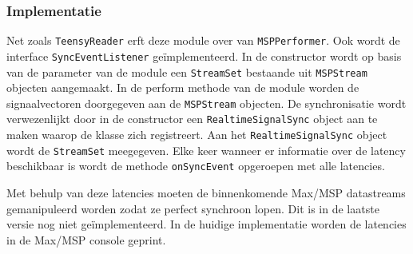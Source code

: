 \subsubsection{Implementatie}

Net zoals \texttt{TeensyReader} erft deze module over van \texttt{MSPPerformer}. Ook wordt de interface \texttt{SyncEventListener} geïmplementeerd. In de constructor wordt op basis van de parameter van de module een \texttt{StreamSet} bestaande uit \texttt{MSPStream} objecten aangemaakt. In de perform methode van de module worden de signaalvectoren doorgegeven aan de \texttt{MSPStream} objecten. De synchronisatie wordt verwezenlijkt door in de constructor een \texttt{RealtimeSignalSync} object aan te maken waarop de klasse zich registreert. Aan het \texttt{RealtimeSignalSync} object wordt de \texttt{StreamSet} meegegeven. Elke keer wanneer er informatie over de latency beschikbaar is wordt de methode \texttt{onSyncEvent} opgeroepen met alle latencies.

Met behulp van deze latencies moeten de binnenkomende Max/MSP datastreams gemanipuleerd worden zodat ze perfect synchroon lopen. Dit is in de laatste versie nog niet geïmplementeerd. In de huidige implementatie worden de latencies in de Max/MSP console geprint.





